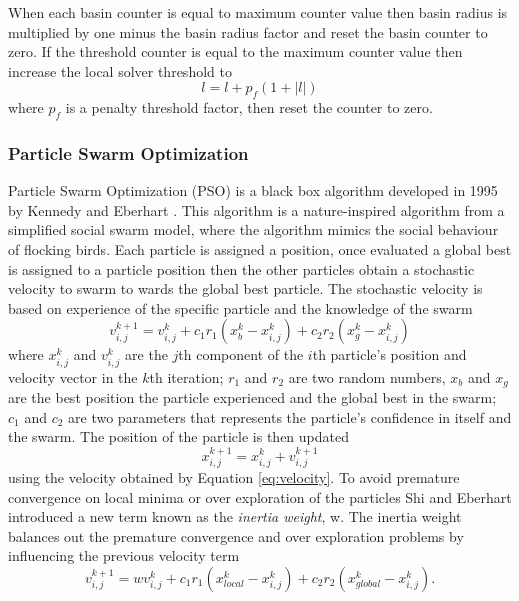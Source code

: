 When each basin counter is equal to maximum counter value then basin radius is multiplied by one minus the basin radius factor and reset the basin counter to zero. If the threshold counter is equal to the maximum counter value then increase the local solver threshold to
\begin{equation}
    l = l + p_f(1+|l|)
\end{equation}
where $p_f$ is a penalty threshold factor, then reset the counter to zero.

\subsubsection{Particle Swarm Optimization}
Particle Swarm Optimization (PSO) is a black box algorithm developed in 1995 by Kennedy and Eberhart \cite{Kennedy1995}. This algorithm is a nature-inspired algorithm from a simplified social swarm model, where the algorithm mimics the social behaviour of flocking birds. Each particle is assigned a position, once evaluated a global best is assigned to a particle position then the other particles obtain a stochastic velocity to swarm to wards the global best particle. The stochastic velocity is
based on experience of the specific particle and the knowledge of the swarm
\begin{equation}
    \label{eq:velocity}
    v^{k+1}_{i,j} = v^{k}_{i,j} + c_1r_1(x^{k}_b - x^{k}_{i,j}) + c_2r_2(x^{k}_g - x^{k}_{i,j})
\end{equation}
where $x^k_{i,j}$ and $v^k_{i,j}$ are the $j$th component of the $i$th particle's position and velocity vector in the $k$th iteration; $r_1$ and $r_2$ are two random numbers, $x_b$ and $x_g$ are the best position the particle experienced and the global best in the swarm; $c_1$ and $c_2$ are two parameters that represents the particle's confidence in itself and the swarm. The position of the particle is then updated 
\begin{equation}
    \label{eq:position}
    x^{k+1}_{i,j} = x^k_{i,j} + v^{k+1}_{i,j}
\end{equation}
using the velocity obtained by Equation \ref{eq:velocity}. To avoid premature convergence on local minima or over exploration of the particles Shi and Eberhart \cite{Eberhart2000} introduced a new term known as the \textit{inertia weight}, w. The inertia weight balances out the premature convergence and over exploration problems by influencing the previous velocity term
\begin{equation}
    \label{eq:velocity2}
    v^{k+1}_{i,j} = wv^{k}_{i,j} + c_1r_1(x^{k}_{local} - x^{k}_{i,j}) + c_2r_2(x^{k}_{global} - x^{k}_{i,j}).
\end{equation}

